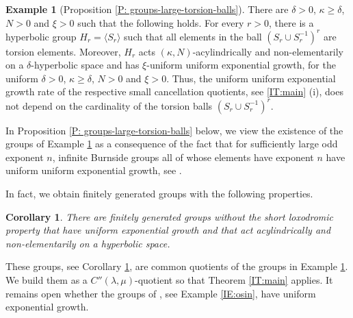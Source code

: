 \documentclass[leqno,a4paper,10pt]{amsart}
\theoremstyle{plain}
\newtheorem{cor}[thm]{Corollary}
\theoremstyle{definition}
\newtheorem{ex}[thm]{Example}
\theoremstyle{remark}
\renewcommand{\geq}{\geqslant}
\let\geq\geqslant
\begin{document}
\begin{ex}[Proposition \ref{P: groups-large-torsion-balls}]\label{IE:infinite} There are $\delta>0$, $\kappa \geq \delta$, $N>0$  and $\xi >0$ such that the following holds. For every $r>0$, there is a hyperbolic group $H_r=\langle S_r\rangle$ such that all elements in the ball $(S_r\cup S_r^{-1})^r$ are torsion elements. Moreover, $H_r$ acts $(\kappa,N)$-acylindrically and non-elementarily on a $\delta$-hyperbolic space and has $\xi$-uniform uniform exponential growth, for the uniform $\delta>0$, $\kappa \geq \delta$, $N>0$  and $\xi >0$. Thus, the uniform uniform exponential growth rate of the respective small cancellation quotients, see \autoref{IT:main} (i), does not depend on the cardinality of the torsion balls $(S_r\cup S_r^{-1})^r$. 
\end{ex}

In Proposition \ref{P: groups-large-torsion-balls} below, we view the existence of the groups of Example \ref{IE:infinite} as a consequence of  the fact that for sufficiently large odd exponent $n$, infinite Burnside groups all of whose elements have exponent $n$ have uniform uniform exponential growth, see \cite{coulon_product_2022}. 

In fact, we obtain finitely generated groups with the following properties. 
\begin{cor}\label{IC:common-quotients} There are finitely generated groups  without the short loxodromic property that have uniform exponential growth and that act acylindrically and non-elementarily on a hyperbolic space. 
\end{cor}
These groups, see Corollary \ref{IC:common-quotients}, are common quotients of the groups in Example \ref{IE:infinite}. We build them  as a $C''(\lambda,\mu)$-quotient so that Theorem \ref{IT:main} applies. 
It remains open whether the groups of \cite{minasyan_acylindrically_2019}, see Example \ref{IE:osin}, have uniform exponential growth.  
\end{document}
